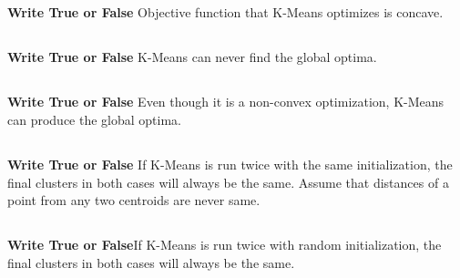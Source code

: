 \begin{frame}
\section{}
{\bf Write True or False} Objective function that K-Means optimizes is concave.

\end{frame}


\begin{frame}
\section{}
{\bf Write True or False} K-Means can never find the global optima.



\end{frame}


\begin{frame}
\section{}
{\bf Write True or False} Even though it is a non-convex optimization, K-Means can produce the global optima.



\end{frame}


\begin{frame}
\section{}
{\bf Write True or False} If K-Means is run twice with the same initialization, the final clusters in both cases will always be the same. Assume that distances of a point from any two centroids are never same.



\end{frame}


\begin{frame}
\section{}
{\bf Write True or False}If K-Means is run twice with random initialization, the final clusters in both cases will always be the same.


\end{frame}
